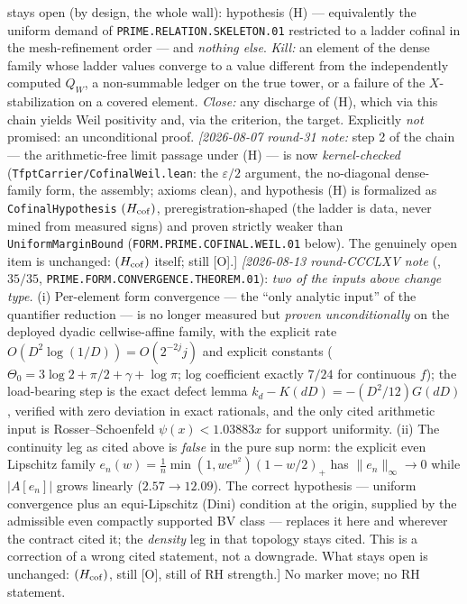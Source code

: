 \documentclass[11pt,a4paper]{article}
\begin{document}
{{stays open (by design, the whole wall):} hypothesis (H) ---
equivalently the uniform demand of
\texttt{PRIME.RELATION.SKELETON.01} restricted to a ladder
cofinal in the mesh-refinement order --- and \emph{nothing
else}.  \emph{Kill:} an element of
the dense family whose ladder values converge to a value
different from the independently computed $Q_W$, a non-summable
ledger on the true tower, or a failure of the $X$-stabilization
on a covered element.  \emph{Close:} any discharge of (H), which
via this chain yields Weil positivity and, via the criterion,
the target.  Explicitly \emph{not} promised: an unconditional
proof.
\emph{[2026-08-07 round-31 note:} step 2 of the chain --- the
arithmetic-free limit passage under (H) --- is now
\emph{kernel-checked} (\texttt{TfptCarrier/CofinalWeil.lean}:
the $\varepsilon/2$ argument, the no-diagonal dense-family form,
the assembly; axioms clean), and hypothesis (H) is formalized as
\texttt{CofinalHypothesis} $(H_{\rm cof})$,
preregistration-shaped (the ladder is data, never mined from
measured signs) and proven strictly weaker than
\texttt{UniformMarginBound}
(\texttt{FORM.PRIME.COFINAL.WEIL.01} below).  The genuinely open
item is unchanged: $(H_{\rm cof})$ itself; still [O].]
\emph{[2026-08-13 round-CCCLXV note}
(, $35/35$,
\texttt{PRIME.FORM.CONVERGENCE.THEOREM.01}): \emph{two of the
inputs above change type.}  (i) Per-element form convergence ---
the ``only analytic input'' of the quantifier reduction --- is no
longer measured but \emph{proven unconditionally} on the
deployed dyadic cellwise-affine family, with the explicit rate
$O(D^2\log(1/D)) = O(2^{-2j}j)$ and explicit constants
($\Theta_0 = 3\log 2 + \pi/2 + \gamma + \log\pi$; log
coefficient exactly $7/24$ for continuous $f$); the load-bearing
step is the exact defect lemma
$k_d - K(dD) = -(D^2/12)G(dD)$, verified with zero deviation in
exact rationals, and the only cited arithmetic input is
Rosser--Schoenfeld $\psi(x) < 1.03883x$ for support uniformity.
(ii) The continuity leg as cited above is \emph{false} in the
pure sup norm: the explicit even Lipschitz family
$e_n(w) = \tfrac1n\min(1, we^{n^2})(1 - w/2)_+$ has
$\|e_n\|_\infty \to 0$ while $|A[e_n]|$ grows linearly
($2.57 \to 12.09$).  The correct hypothesis --- uniform
convergence plus an equi-Lipschitz (Dini) condition at the
origin, supplied by the admissible even compactly supported BV
class --- replaces it here and wherever the contract cited it;
the \emph{density} leg in that topology stays cited.  This is a
correction of a wrong cited statement, not a downgrade.  What
stays open is unchanged: $(H_{\rm cof})$, still [O], still of RH
strength.]
No marker move; no RH statement.\par}
\end{document}
